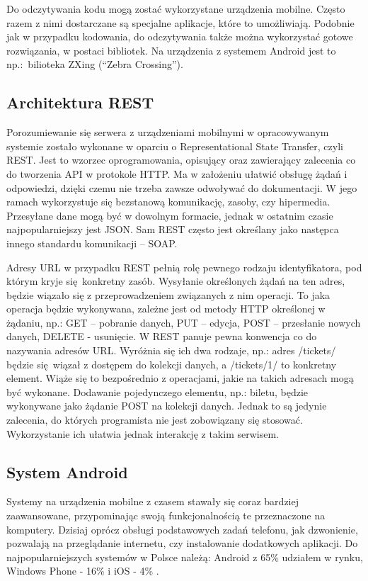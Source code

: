 Do odczytywania kodu mogą zostać wykorzystane urządzenia mobilne. Często razem z nimi dostarczane są specjalne aplikacje, które to umożliwiają. Podobnie jak w przypadku kodowania, do odczytywania także można wykorzystać gotowe rozwiązania, w postaci bibliotek. Na urządzenia z systemem Android jest to np.:~bilioteka ZXing (``Zebra Crossing'').

\subsection{Architektura REST}

Porozumiewanie się serwera z urządzeniami mobilnymi w opracowywanym systemie zostało wykonane w oparciu o Representational State Transfer, czyli REST. Jest to wzorzec oprogramowania, opisujący oraz zawierający zalecenia co do tworzenia API w protokole HTTP. Ma w założeniu ułatwić obsługę żądań i odpowiedzi, dzięki czemu nie trzeba zawsze odwoływać do dokumentacji. W jego ramach wykorzystuje się bezstanową komunikację, zasoby, czy hipermedia. Przesyłane dane mogą być w dowolnym formacie, jednak w ostatnim czasie najpopularniejszy jest JSON. Sam REST często jest określany jako następca innego standardu komunikacji -- SOAP.

Adresy URL w przypadku REST pełnią rolę pewnego rodzaju identyfikatora, pod którym kryje się konkretny zasób. Wysyłanie określonych żądań na ten adres, będzie wiązało się z przeprowadzeniem związanych z nim operacji. To jaka operacja będzie wykonywana, zależne jest od metody HTTP określonej w żądaniu, np.: GET -- pobranie danych, PUT -- edycja, POST -- przesłanie nowych danych, DELETE - usunięcie. W REST panuje pewna konwencja co do nazywania adresów URL. Wyróżnia się ich dwa rodzaje, np.: adres /tickets/ będzie się wiązał z dostępem do kolekcji danych, a /tickets/1/ to konkretny element. Wiąże się to bezpośrednio z operacjami, jakie na takich adresach mogą być wykonane. Dodawanie pojedynczego elementu, np.: biletu, będzie wykonywane jako żądanie POST na kolekcji danych. Jednak to są jedynie zalecenia, do których programista nie jest zobowiązany się stosować. Wykorzystanie ich ułatwia jednak interakcję z takim serwisem.

\subsection{System Android}

Systemy na urządzenia mobilne z czasem stawały się coraz bardziej zaawansowane, przypominając swoją funkcjonalnością te przeznaczone na komputery. Dzisiaj oprócz obsługi podstawowych zadań telefonu, jak dzwonienie, pozwalają na przeglądanie internetu, czy instalowanie dodatkowych aplikacji. Do najpopularniejszych systemów w Polsce należą: Android z 65\% udziałem w rynku, Windows Phone - 16\% i iOS - 4\% \cite{polska_jest_mobi}.

